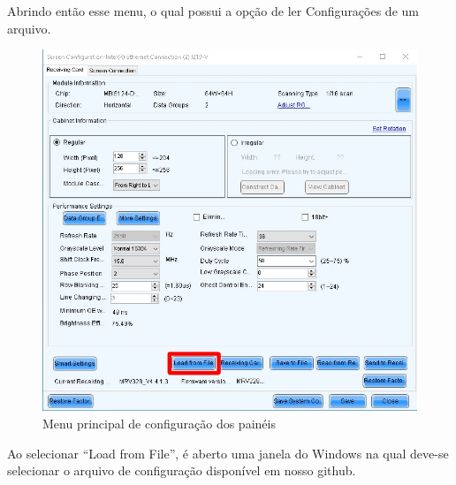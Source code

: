 \documentclass[12pt, a4paper]{article}
\begin{document}
\newpage
Abrindo então esse menu, o qual possui a opção de ler Configurações de um arquivo.
\begin{figure}[!htb]
	\centering
	\includegraphics[width=\textwidth]{SC1.jpeg}
	\caption{\label{fig:SC1.jpeg}Menu principal de configuração dos painéis}
\end{figure}

Ao selecionar ``Load from File'', é aberto uma janela do Windows na qual deve-se selecionar o arquivo de configuração disponível em nosso github\cite{arquivoConfig}.
\end{document}

